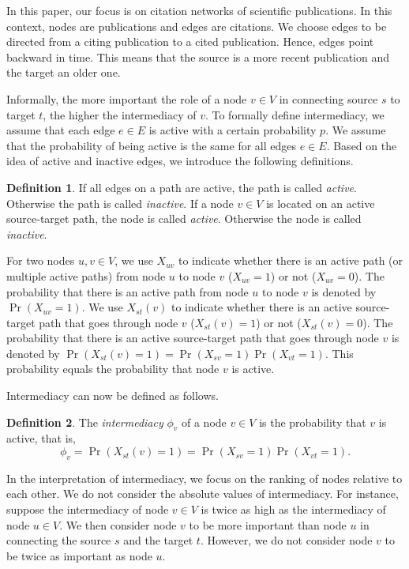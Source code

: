 \documentclass[9pt,twocolumn,twoside]{pnas-alt} %
\theoremstyle{definition}
\newtheorem{definition}{Definition}
\begin{document}
In this paper, our focus is on citation networks of scientific publications. In this context, nodes are publications and edges are citations. We choose edges to be directed from a citing publication to a cited publication. Hence, edges point backward in time. This means that the source is a more recent publication and the target an older one.

Informally, the more important the role of a node $v \in V$ in connecting source $s$ to target $t$, the higher the intermediacy of $v$. To formally define intermediacy, we assume that each edge $e \in E$ is active with a certain probability $p$. We assume that the probability of being active is the same for all edges $e \in E$. Based on the idea of active and inactive edges, we introduce the following definitions.

\begin{definition}
    If all edges on a path are active, the path is called \emph{active}. Otherwise the path is called \emph{inactive}. If a node $v \in V$ is located on an active source-target path, the node is called \emph{active}. Otherwise the node is called \emph{inactive}.
\end{definition}

For two nodes $u, v \in V$, we use $X_{uv}$ to indicate whether there is an active path (or multiple active paths) from node $u$ to node $v$ ($X_{uv} = 1$) or not ($X_{uv} = 0$). The probability that there is an active path from node $u$ to node $v$ is denoted by $\Pr(X_{uv} = 1)$. We use $X_{st}(v)$ to indicate whether there is an active source-target path that goes through node $v$ ($X_{st}(v) = 1$) or not ($X_{st}(v) = 0$). The probability that there is an active source-target path that goes through node $v$ is denoted by $\Pr(X_{st}(v) = 1) = \Pr(X_{sv} = 1)\Pr(X_{vt} = 1)$. This probability equals the probability that node $v$ is active.

Intermediacy can now be defined as follows.

\begin{definition}
    The \emph{intermediacy} $\phi_v$ of a node $v \in V$ is the probability that $v$ is active, that is,
    \begin{equation}
        \phi_v = \Pr(X_{st}(v) = 1) = \Pr(X_{sv} = 1)\Pr(X_{vt} = 1).
        \label{eq:decom}
    \end{equation}
\end{definition}

In the interpretation of intermediacy, we focus on the ranking of nodes relative to each other. We do not consider the absolute values of intermediacy. For instance, suppose the intermediacy of node $v \in V$ is twice as high as the intermediacy of node $u \in V$. We then consider node $v$ to be more important than node $u$ in connecting the source $s$ and the target $t$. However, we do not consider node $v$ to be twice as important as node $u$.
\end{document}
